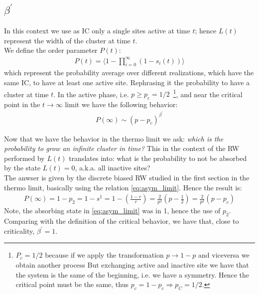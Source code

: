 \documentclass[4apaper,11pt,fleqn]{article}
\theoremstyle{remark}
\theoremstyle{definition}
\begin{document}
\subsection{$\beta^\prime$}
In this context we use as IC only a single sites active at time $t$; hence $L(t)$ represent the width of the cluster at time $t$.\\
We define the order parameter $P(t)$:
\begin{align*}
  P(t) = \langle 1 - \prod_{i=0}^{\infty}(1-s_i(t)) \rangle
\end{align*}
which represent the probability average over different realizations, which have the same IC, to have at least one active site. Rephrasing it the probability to have a cluster at time $t$. In the active phase, i.e. $p \geq p_c = 1/2 $\, \footnote{$P_c=1/2$ because if we apply the transformation $ p \rightarrow 1-p $ and viceversa we obtain another process But exchanging active and inactive site we have that the system is the same of the beginning, i.e. we have a symmetry. Hence the critical point must be the same, thus $p_c=1-p_c \Rightarrow p_C=1/2$. }, and near the critical point in the $t \rightarrow \infty$ limit we have the following behavior:
\begin{align*}
  P(\infty) \sim (p-p_c)^{\beta^\prime}
\end{align*}

Now that we have the behavior in the thermo limit we ask: \emph{which is the probability to grow an infinite cluster in time?}
This in the context of the RW performed by $L(t)$ translates into: what is the probability to not be absorbed by the state $L(t)=0$, a.k.a. all inactive sites?\\
The anwser is given by the discrete biased RW studied in the first section in the thermo limit, basically using the relation \eqref{eq:asym_limit}. Hence the result is:
\begin{align*}
  P(\infty) = 1 - p_2 = 1 - s^1 = 1 - \left(  \frac{1-r}{r}  \right) = \frac{2}{p^2} \left( p - \frac{1}{2} \right) = \frac{2}{p^2} \left( p - p_c \right)
\end{align*}
Note, the absorbing state in \eqref{eq:asym_limit} was in 1, hence the use of $p_2$. Comparing with the definition of the critical behavior, we have that, close to criticality, $\beta^\prime = 1$.

\end{document}
